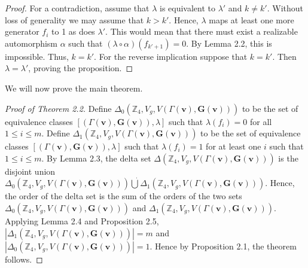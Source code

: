 \documentclass{amsart}
\theoremstyle{definition}
\numberwithin{equation}{section}
\begin{document}
\begin{proof}
For a contradiction, assume that $\lambda$ is equivalent to $\lambda'$ and $k\neq{k'}$. Without loss of generality we may assume that $k>k'$. Hence, $\lambda$ maps at least one more generator $f_i$ to 1 as does $\lambda'$. This would mean that there must exist a realizable automorphism $\alpha$ such that $(\lambda\circ\alpha)(f_{k'+1})=0$. By Lemma 2.2, this is impossible. Thus, $k=k'$. For the reverse implication suppose that $k=k'$. Then $\lambda=\lambda'$, proving the proposition.
\end{proof}

We will now prove the main theorem.

\begin{proof}[Proof of Theorem 2.2]
Define $\Delta_0(\mathbb{Z}_{4},V_g,V(\Gamma({\mathbf{v}}),{\mathbf{G(v)}}))$ to be the set of equivalence classes $[(\Gamma({\mathbf{v}}),{\mathbf{G(v)}}),\lambda]$ such that $\lambda(f_i)=0$ for all $1\leq{i}\leq{m}$. Define $\Delta_1(\mathbb{Z}_{4},V_g,V(\Gamma({\mathbf{v}}),{\mathbf{G(v)}}))$ to be the set of equivalence classes $[(\Gamma({\mathbf{v}}),{\mathbf{G(v)}}),\lambda]$ such that $\lambda(f_i)=1$ for at least one $i$ such that $1\leq{i}\leq{m}$. By Lemma 2.3, the delta set $\Delta(\mathbb{Z}_{4},V_g,V(\Gamma({\mathbf{v}}),{\mathbf{G(v)}}))$ is the disjoint union $\Delta_0(\mathbb{Z}_{4},V_g,V(\Gamma({\mathbf{v}}),{\mathbf{G(v)}}))\dot{\bigcup}\Delta_1(\mathbb{Z}_{4},V_g,V(\Gamma({\mathbf{v}}),{\mathbf{G(v)}}))$. Hence, the order of the delta set is the sum of the orders of the two sets $\Delta_0(\mathbb{Z}_{4},V_g,V(\Gamma({\mathbf{v}}),{\mathbf{G(v)}}))$ and $\Delta_1(\mathbb{Z}_{4},V_g,V(\Gamma({\mathbf{v}}),{\mathbf{G(v)}}))$. Applying Lemma 2.4 and Proposition 2.5, $|\Delta_1(\mathbb{Z}_{4},V_g,V(\Gamma({\mathbf{v}}),{\mathbf{G(v)}}))|=m$ and \\$|\Delta_0(\mathbb{Z}_{4},V_g,V(\Gamma({\mathbf{v}}),{\mathbf{G(v)}}))|=1$. Hence by Proposition 2.1, the theorem follows.
\end{proof}
\end{document}
